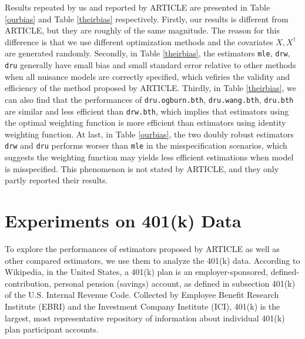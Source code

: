 \documentclass{article}
\begin{document}
Results repeated by us and reported by ARTICLE are presented in Table \ref*{ourbias} and Table \ref*{theirbias} respectively. Firstly, our results is different from ARTICLE, but they are roughly of the same magnitude. The reason for this difference is that we use different optimization methods and the covariates $X, X^\dagger$ are generated randomly. Secondly, in Table \ref*{theirbias}, the estimators \texttt{mle}, \texttt{drw}, \texttt{dru} generally have small bias and small standard error relative to other methods when all nuisance models are correctly specified, which vefiries the validity and efficiency of the method proposed by ARTICLE. Thirdly, in Table \ref*{theirbias}, we can also find that the performances of \texttt{dru.ogburn.bth}, \texttt{dru.wang.bth}, \texttt{dru.bth} are similar and less efficient than \texttt{drw.bth}, which implies that estimators using the optimal weighting function is more efficient than estimators using identity weighting function. At last, in Table \ref*{ourbias}, the two doubly robust estimators \texttt{drw} and \texttt{dru} performs worser than \texttt{mle} in the misspecification scenarios, which suggests the weighting function may yields less efficient estimations when model is misspecified. This phenomenon is not stated by ARTICLE, and they only partly reported their results.


\section{Experiments on 401(k) Data}
To explore the performances of estimators proposed by ARTICLE as well as other compared estimators, we use them to analyze the 401(k) data. According to Wikipedia, in the United States, a 401(k) plan is an employer-sponsored, defined-contribution, personal pension (savings) account, as defined in subsection 401(k) of the U.S. Internal Revenue Code. Collected by Employee Benefit Research Institute (EBRI) and the Investment Company Institute (ICI), 401(k) is the largest, most representative repository of information about individual 401(k) plan participant accounts.
\end{document}
